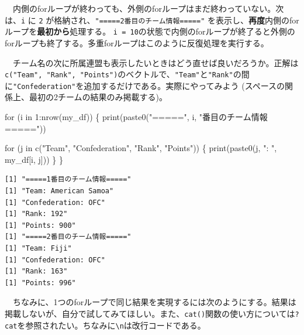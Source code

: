 \documentclass[
  a4paper,
  pandoc,
  ja=standard,
  jafont=haranoaji]{bxjsbook}
\newenvironment{Shaded}{\begin{snugshade}}{\end{snugshade}}
\newcommand{\ControlFlowTok}[1]{\textcolor[rgb]{0.00,0.48,0.65}{#1}}
\newcommand{\DecValTok}[1]{\textcolor[rgb]{0.68,0.00,0.00}{#1}}
\newcommand{\FunctionTok}[1]{\textcolor[rgb]{0.28,0.35,0.67}{#1}}
\newcommand{\NormalTok}[1]{\textcolor[rgb]{0.00,0.48,0.65}{#1}}
\newcommand{\SpecialCharTok}[1]{\textcolor[rgb]{0.37,0.37,0.37}{#1}}
\newcommand{\StringTok}[1]{\textcolor[rgb]{0.13,0.47,0.30}{#1}}
\begin{document}
　内側のforループが終わっても、外側のforループはまだ終わっていない。次は、\texttt{i}
に \texttt{2} が格納され、\texttt{"=====2番目のチーム情報====="}
を表示し、\textbf{再度}内側のforループを\textbf{最初から}処理する。
\texttt{i\ =\ 10}の状態で内側のforループが終了ると外側のforループも終了する。多重forループはこのように反復処理を実行する。

　チーム名の次に所属連盟も表示したいときはどう直せば良いだろうか。正解は\texttt{c("Team",\ "Rank",\ "Points")}のベクトルで、\texttt{"Team"}と\texttt{"Rank"}の間に\texttt{"Confederation"}を追加するだけである。実際にやってみよう
(スペースの関係上、最初の2チームの結果のみ掲載する)。

\begin{Shaded}
\begin{Highlighting}[numbers=left,,]
\ControlFlowTok{for}\NormalTok{ (i }\ControlFlowTok{in} \DecValTok{1}\SpecialCharTok{:}\FunctionTok{nrow}\NormalTok{(my\_df)) \{}
  \FunctionTok{print}\NormalTok{(}\FunctionTok{paste0}\NormalTok{(}\StringTok{"====="}\NormalTok{, i, }\StringTok{"番目のチーム情報====="}\NormalTok{))}
  
  \ControlFlowTok{for}\NormalTok{ (j }\ControlFlowTok{in} \FunctionTok{c}\NormalTok{(}\StringTok{"Team"}\NormalTok{, }\StringTok{"Confederation"}\NormalTok{, }\StringTok{"Rank"}\NormalTok{, }\StringTok{"Points"}\NormalTok{)) \{}
    \FunctionTok{print}\NormalTok{(}\FunctionTok{paste0}\NormalTok{(j, }\StringTok{": "}\NormalTok{, my\_df[i, j]))}
\NormalTok{  \}}
\NormalTok{\}}
\end{Highlighting}
\end{Shaded}

\begin{verbatim}
[1] "=====1番目のチーム情報====="
[1] "Team: American Samoa"
[1] "Confederation: OFC"
[1] "Rank: 192"
[1] "Points: 900"
[1] "=====2番目のチーム情報====="
[1] "Team: Fiji"
[1] "Confederation: OFC"
[1] "Rank: 163"
[1] "Points: 996"
\end{verbatim}

　ちなみに、1つのforループで同じ結果を実現するには次のようにする。結果は掲載しないが、自分で試してみてほしい。また、\texttt{cat()}関数の使い方については\texttt{?cat}を参照されたい。ちなみに\texttt{\textbackslash{}n}は改行コードである。
\end{document}
